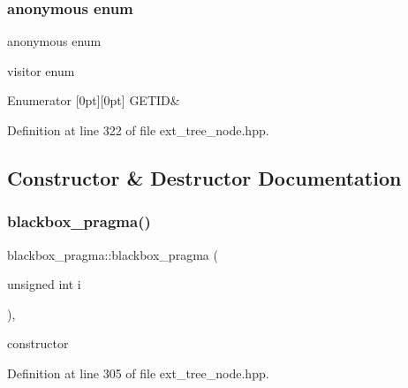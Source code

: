 \subsubsection{\texorpdfstring{anonymous enum}{anonymous enum}}
{\footnotesize\ttfamily anonymous enum}



visitor enum 

\begin{DoxyEnumFields}{Enumerator}
[0pt][0pt]{}\mbox{\label{structblackbox__pragma_a1a3fda9ce4c062bba9c74fd4c4760085a26c042cebd6073413393371f205de751}} 
G\+E\+T\+ID&\\
\hline

\end{DoxyEnumFields}


Definition at line 322 of file ext\+\_\+tree\+\_\+node.\+hpp.



\subsection{Constructor \& Destructor Documentation}
\mbox{\label{structblackbox__pragma_aefe7dbd45022c9193ea86410980dce42}} 
\subsubsection{\texorpdfstring{blackbox\+\_\+pragma()}{blackbox\_pragma()}}
{\footnotesize\ttfamily blackbox\+\_\+pragma\+::blackbox\+\_\+pragma (\begin{DoxyParamCaption}\item[{unsigned int}]{i }\end{DoxyParamCaption})\hspace{0.3cm}{\ttfamily [inline]}, {\ttfamily [explicit]}}



constructor 



Definition at line 305 of file ext\+\_\+tree\+\_\+node.\+hpp.



